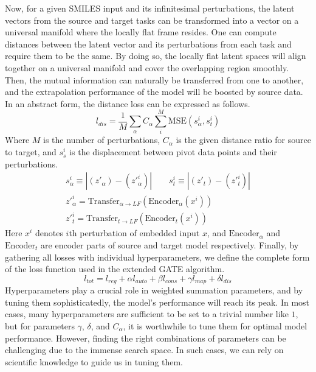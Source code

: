 Now, for a given SMILES input and its infinitesimal perturbations, the latent vectors from the source and target tasks can be transformed into a vector on a universal manifold where the locally flat frame resides. One can compute distances between the latent vector and its perturbations from each task and require them to be the same. By doing so, the locally flat latent spaces will align together on a universal manifold and cover the overlapping region smoothly. Then, the mutual information can naturally be transferred from one to another, and the extrapolation performance of the model will be boosted by source data. In an abstract form, the distance loss can be expressed as follows.
\begin{equation}
    l_{dis} = \frac{1}{M}\sum_\alpha C_\alpha\sum_{i}^M \mathrm{MSE}(s^{i}_\alpha, s^{i}_t)
\end{equation}
Where $M$ is the number of perturbations, $C_\alpha$ is the given distance ratio for source to target, and $s^{i}_{s}$ is the displacement between pivot data points and their perturbations.
\begin{gather}
    s^{i}_\alpha \equiv |(z'_\alpha) - (z'^i_\alpha)| \qquad s^{i}_t \equiv |(z'_t) - (z'^i_t)| \\
    z'^i_\alpha = \mathrm{Transfer}_{\alpha\rightarrow LF}(\mathrm{Encoder}_\alpha(x^i))\\
    z'^i_t = \mathrm{Transfer}_{t\rightarrow LF}(\mathrm{Encoder}_t(x^i))   
\end{gather}
Here $x^i$ denotes $i$th perturbation of embedded input $x$, and $\mathrm{Encoder}_\alpha$ and $\mathrm{Encoder}_t$ are encoder parts of source and target model respectively. Finally, by gathering all losses with individual hyperparameters, we define the complete form of the loss function used in the extended GATE algorithm.
\begin{equation}
    l_{tot} = l_{reg} + \alpha l_{auto} + \beta l_{cons} + \gamma l_{map} + \delta l_{dis}
\end{equation}
Hyperparameters play a crucial role in weighted summation parameters, and by tuning them sophisticatedly, the model's performance will reach its peak. In most cases, many hyperparameters are sufficient to be set to a trivial number like $1$, but for parameters $\gamma$, $\delta$, and $C_\alpha$, it is worthwhile to tune them for optimal model performance. However, finding the right combinations of parameters can be challenging due to the immense search space. In such cases, we can rely on scientific knowledge to guide us in tuning them. 

